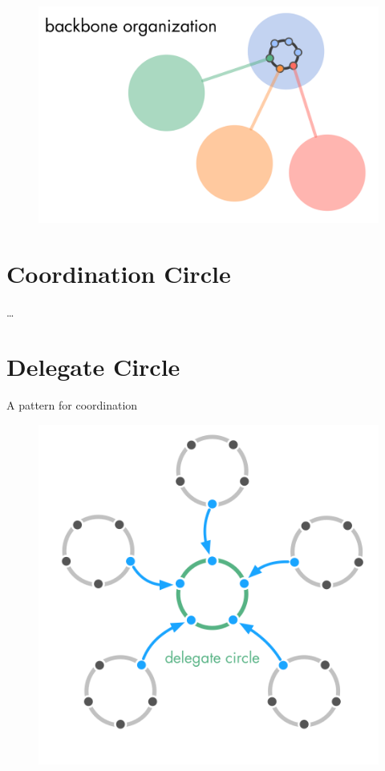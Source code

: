 \begin{figure}[htbp]
\centering
\includegraphics[keepaspectratio,width=\textwidth,height=0.75\textheight]{img/structural-patterns/backbone-organization.png}
\end{figure}

\section{Coordination Circle}
\label{coordinationcircle}

{\ldots}

\section{Delegate Circle}
\label{delegatecircle}

A pattern for coordination

\begin{figure}[htbp]
\centering
\includegraphics[keepaspectratio,width=\textwidth,height=0.75\textheight]{img/structural-patterns/delegate-circle.png}
\end{figure}

